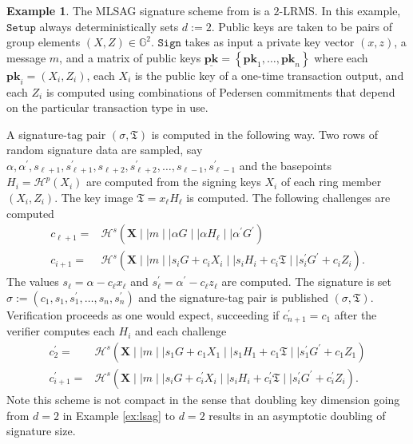 \documentclass{mrl}
\theoremstyle{plain}
\theoremstyle{definition}
\newtheorem{example}{Example}[section]
\begin{document}
\begin{example}\label{ex:mlsag}
The MLSAG signature scheme from \cite{noether2016ring} is a $2$-LRMS. In this example, $\texttt{Setup}$ always deterministically sets $d := 2$. Public keys are taken to be pairs of group elements $(X, Z) \in \mathbb{G}^2$. $\texttt{Sign}$ takes as input a private key vector $(x,z)$, a message $m$, and a matrix of public keys $\underline{\textbf{pk}} = \left\{\textbf{pk}_1, \ldots, \textbf{pk}_n\right\}$ where each $\textbf{pk}_i = (X_i, Z_i)$, each $X_i$ is the public key of a one-time transaction output, and each $Z_i$ is computed using combinations of Pedersen commitments that depend on the particular transaction type in use. %

A signature-tag pair $(\sigma, \mathfrak{T})$ is computed in the following way. Two rows of random signature data are sampled, say  $\alpha, \alpha^\prime, s_{\ell + 1}, s^\prime_{\ell + 1}, s_{\ell + 2}, s^\prime_{\ell + 2}, \ldots, s_{\ell -1}, s^\prime_{\ell - 1}$  and the basepoints $H_i = \mathcal{H}^p(X_i)$ are computed from the signing keys $X_i$ of each ring member $(X_i, Z_i)$. The key image $\mathfrak{T} = x_\ell H_\ell$ is computed. The following  challenges are computed
\begin{align*}
c_{\ell + 1} =& \mathcal{H}^s(\textbf{X} \mid \mid m \mid \mid \alpha G \mid \mid \alpha H_\ell \mid \mid \alpha^\prime G^\prime) \\
c_{i+1} =& \mathcal{H}^s(\textbf{X} \mid \mid m \mid \mid s_i G + c_i X_i \mid \mid s_i H_i + c_i \mathfrak{T} \mid \mid s_i^\prime G^\prime + c_i Z_i). \end{align*}The values $s_\ell = \alpha - c_\ell x_\ell$ and $s_\ell^\prime = \alpha^\prime - c_\ell z_\ell$ are computed. The signature is set $\sigma := (c_1, s_1, s_1^\prime, \ldots, s_n, s_n^\prime)$ and the signature-tag pair is published $(\sigma, \mathfrak{T})$. Verification proceeds as one would expect, succeeding if $c_{n+1}^\prime = c_1$ after the verifier computes each $H_i$ and each challenge
\begin{align*}
c_{2}^\prime =&  \mathcal{H}^s(\textbf{X} \mid \mid m \mid \mid s_1 G + c_1 X_1 \mid \mid s_1 H_1 + c_1 \mathfrak{T} \mid \mid s_1^\prime G^\prime + c_1 Z_1) \\
c_{i+1}^\prime =&  \mathcal{H}^s\left(\textbf{X} \mid \mid m \mid \mid s_i G + c_i^\prime X_i \mid \mid s_i H_i + c_i^\prime \mathfrak{T} \mid \mid s_i^\prime G^\prime + c_i^\prime Z_i \right).
\end{align*} 
Note this scheme is not compact in the sense that doubling key dimension going from $d=2$ in Example \ref{ex:lsag} to $d=2$ results in an asymptotic doubling of signature size. 
\end{example}
\end{document}
